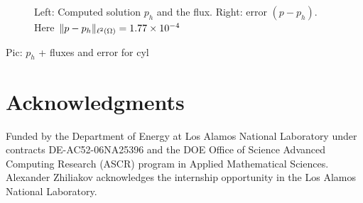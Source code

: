 \begin{figure}[H]
	\centering
	\begin{subfigure}[t]{.5\linewidth}
		\centering
	\end{subfigure}%
	\begin{subfigure}[t]{.5\linewidth}
		\centering
	\end{subfigure}%
	\caption{Left: Computed solution $p_h$ and the flux. Right: error $(p - p_h)$. Here~$\|p - p_h\|_{{\ell^2\left({\Omega}\right)}} = 1.77\times 10^{-4}$}
	\label{fig:cyl}		
\end{figure}


Pic: $p_h$ + fluxes and error for cyl

\section*{Acknowledgments}

Funded by the Department of Energy at Los Alamos National Laboratory
under contracts DE-AC52-06NA25396 and the DOE Office of Science
Advanced Computing Research (ASCR) program in Applied Mathematical
Sciences. Alexander Zhiliakov acknowledges the internship opportunity in the Los Alamos National Laboratory.






